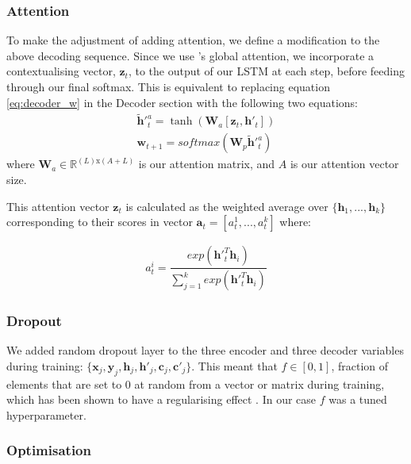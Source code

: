 \subsubsection{Attention}

To make the adjustment of adding attention, we define a modification to the above decoding sequence. Since we use \citet{luong_effective_2015}'s global attention, we incorporate a contextualising vector, $\textbf{z}_t$, to the output of our LSTM at each step, before feeding through our final softmax. This is equivalent to replacing equation \ref{eq:decoder_w} in the Decoder section with the following two equations:
\begin{align}
    \tilde{\textbf{h}}'^a_t =  \tanh(\textbf{W}_a[\textbf{z}_t, \textbf{h}'_t])\\
    \textbf{w}_{t+1} = softmax(\textbf{W}_p\tilde{\textbf{h}}'^a_t) \label{eq:s2syw}  
\end{align}
where $\textbf{W}_a \in \mathbb{R}^{(L)\text{x}(A+L)} $ is our attention matrix, and 
$A$ is our attention vector size.

This attention vector $\textbf{z}_t$ is calculated as the weighted average over  $\{\textbf{h}_1,...,\textbf{h}_k\}$ corresponding to their scores in vector $\textbf{a}_t = [a_t^1,...,a_t^k]$ where:

\begin{align}
    a_t^i = \dfrac{exp(\mathbf{h}'^{T}_t\mathbf{h}_i)}{\sum_{j=1}^kexp(\mathbf{h}'^{T}_t\mathbf{h}_i)} 
\end{align}

\subsubsection{Dropout}

We added random dropout layer to the three encoder and three decoder variables during training:
$\{\textbf{x}_j, \textbf{y}_j, \textbf{h}_j, \textbf{h}'_j, \textbf{c}_j, \textbf{c}'_j\}$.  This meant that $f \in [0,1]$, fraction of elements that are set to 0 at random from a vector or matrix during training, which has been shown to have a regularising effect  \citep{JMLR:v15:srivastava14a}. In our case $f$ was a tuned hyperparameter. 

\subsubsection{Optimisation}

